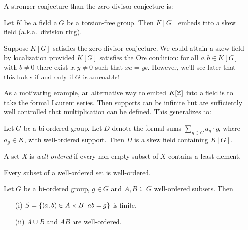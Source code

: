 A stronger conjecture than the zero divisor conjecture is:

\begin{conjecture}
    Let $K$ be a field a $G$ be a torsion-free group.
    Then $K[G]$ embeds into a skew field (a.k.a.\ division ring).
\end{conjecture}

Suppose $K[G]$ satisfies the zero divisor conjecture.
We could attain a skew field by localization provided $K[G]$ satisfies the Ore condition: for all $a, b \in K[G]$ with $b \neq 0$ there exist $x, y \neq 0$ such that $xa = yb$.
However, we'll see later that this holds if and only if $G$ is amenable! %

As a motivating example, an alternative way to embed $K[\mathbb{Z}]$ into a field is to take the formal Laurent series.
Then supports can be infinite but are sufficiently well controlled that multiplication can be defined.
This generalizes to:

\begin{theorem}
    \label{theorem:malcev_neumann}
    Let $G$ be a bi-ordered group.
    Let $D$ denote the formal sums $\sum_{g \in G} a_g \cdot g$, where $a_g \in K$, with well-ordered support.
    Then $D$ is a skew field containing $K[G]$.
\end{theorem}

\begin{definition}
    A set $X$ is \emph{well-ordered} if every non-empty subset of $X$ contains a least element.
\end{definition}

Every subset of a well-ordered set is well-ordered.

\begin{lemma}
    \label{lemma:wellordered_products}
    Let $G$ be a bi-ordered group, $g \in G$ and $A, B \subseteq G$ well-ordered subsets.
    Then
    \begin{enumerate}
        \item[(i)] $S = \left\{ (a, b) \in A \times B \,\middle|\, ab = g \right\}$ is finite.
        \item[(ii)] $A \cup B$ and $AB$ are well-ordered.
    \end{enumerate}
\end{lemma}


